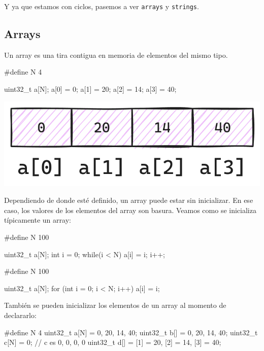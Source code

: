 \documentclass[]{scrartcl}
\begin{document}
Y ya que estamos con ciclos, pasemos a ver \texttt{arrays} y \texttt{strings}.

\subsection*{Arrays}
Un array es una tira contigua en memoria de elementos del mismo tipo.

\begin{cbox}[]{}
#define N 4

uint32_t a[N];
a[0] = 0;
a[1] = 20;
a[2] = 14;
a[3] = 40;

\end{cbox}

\begin{center}
  \includegraphics[scale=0.25]{./img/array.png}
  \label{fig:array}
\end{center}

Dependiendo de donde esté definido, un array puede estar sin inicializar. En ese caso, los valores de los elementos del array son basura. Veamos como se inicializa típicamente un array:

\begin{cbox}[]{}
  #define N 100

  uint32_t a[N];
  int i = 0;
  while(i < N){
    a[i] = i;
    i++;
  }
\end{cbox}

\begin{cbox}[]{}
  #define N 100

  uint32_t a[N];
  for (int i = 0; i < N; i++){
    a[i] = i;
  }
\end{cbox}

También se pueden inicializar los elementos de un array al momento de declararlo:

\begin{cbox}[]{}
#define N 4
uint32_t a[N] = {0, 20, 14, 40};
uint32_t b[] = {0, 20, 14, 40};
uint32_t c[N] = {0}; // c es {0, 0, 0, 0}
uint32_t d[] = {[1] = 20, [2] = 14, [3] = 40};
\end{cbox}
\end{document}
